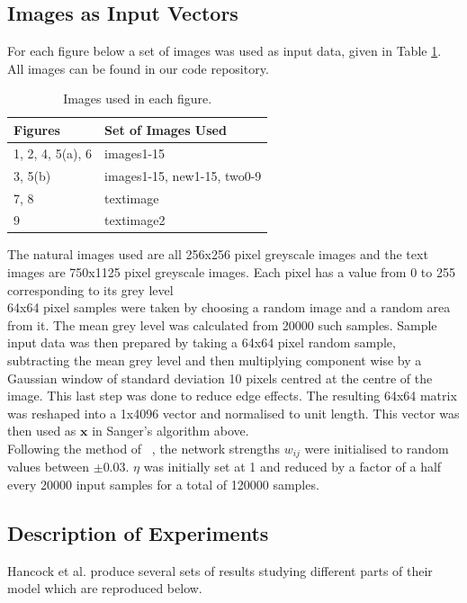 \subsection{Images as Input Vectors}

For each figure below a set of images was used as input data, given in Table \ref{tab:Table 1}. All images can be found in our code repository. 
\begin{table}[h]
    \centering
    \begin{tabular}{ll}
    \hline
    Figures&Set of Images Used\\
    \hline
    1, 2, 4, 5(a), 6&images1-15\\
    3, 5(b)&images1-15, new1-15, two0-9\\
    7, 8&textimage\\
    9&textimage2\\
    \hline
    \end{tabular}
    \caption{Images used in each figure.}
    \label{tab:Table 1}
\end{table}
The natural images used are all 256x256 pixel greyscale images and the text images are 750x1125 pixel greyscale images. Each pixel has a value from 0 to 255 corresponding to its grey level\\
64x64 pixel samples were taken by choosing a random image and a random area from it. The mean grey level was calculated from 20000 such samples. Sample input data was then prepared by taking a 64x64 pixel random sample, subtracting the mean grey level and then multiplying component wise by a Gaussian window of standard deviation 10 pixels centred at the centre of the image. This last step was done to reduce edge effects. The resulting 64x64 matrix was reshaped into a 1x4096 vector and normalised to unit length. This vector was then used as $\textbf{x}$ in Sanger's algorithm above.\\
Following the method of ~\cite{Hancock1991-mp}, the network strengths $w_{ij}$ were initialised to random values between $\pm 0.03$. $\eta$ was initially set at 1 and reduced by a factor of a half every 20000 input samples for a total of 120000 samples.

\subsection{Description of Experiments}
Hancock et al. produce several sets of results studying different parts of their model which are reproduced below.
